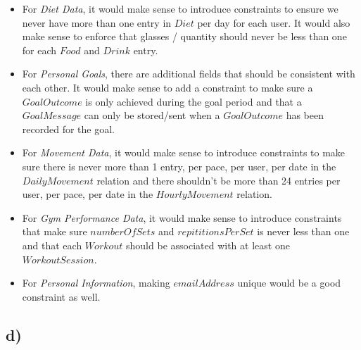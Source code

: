 \documentclass{article}
\begin{document}
\begin{itemize}
  \item For {\em Diet Data}, it would make sense to introduce constraints to ensure we never have more than one entry in $Diet$ per day for each user. It would also make sense to enforce that glasses / quantity should never be less than one for each $Food$ and $Drink$ entry.
  \item For {\em Personal Goals}, there are additional fields that should be consistent with each other. It would make sense to add a constraint to make sure a $GoalOutcome$ is only achieved during the goal period and that a $GoalMessage$ can only be stored/sent when a $GoalOutcome$ has been recorded for the goal.
  \item For {\em Movement Data}, it would make sense to introduce constraints to make sure there is never more than 1 entry, per pace, per user, per date in the $DailyMovement$ relation and there shouldn't be more than 24 entries per user, per pace, per date in the $HourlyMovement$ relation. 
  \item For {\em Gym Performance Data}, it would make sense to introduce constraints that make sure $numberOfSets$ and $repititionsPerSet$ is never less than one and that each $Workout$ should be associated with at least one $WorkoutSession$.
  \item For {\em Personal Information}, making $emailAddress$ unique would be a good constraint as well.
\end{itemize}

\subsection*{\small d)}
\end{document}
